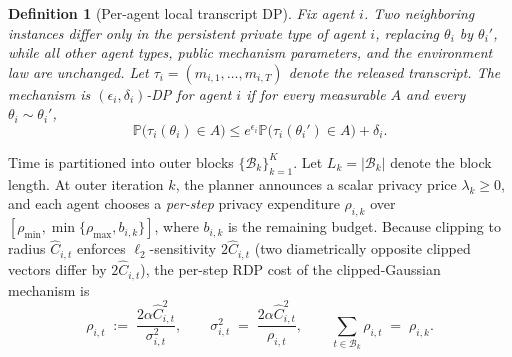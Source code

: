 \documentclass{article}
\newtheorem{definition}{Definition}
\newcommand{\Prob}{\mathbb{P}}
\begin{document}
\begin{definition}[Per-agent local transcript DP]
\label{def:PALT}
Fix agent $i$. Two neighboring instances differ only in the persistent private type of agent $i$, replacing $\theta_i$ by $\theta_i'$, while all other agent types, public mechanism parameters, and the environment law are unchanged. Let $\tau_i = (m_{i,1}, \ldots, m_{i,T})$ denote the released transcript. The mechanism is $(\epsilon_i, \delta_i)$-DP for agent $i$ if for every measurable $A$ and every $\theta_i \sim \theta_i'$,
\begin{equation}
\Prob\big(\tau_i(\theta_i)\in A\big)
\le
e^{\epsilon_i}\Prob\big(\tau_i(\theta_i')\in A\big)+\delta_i.
\end{equation}
\end{definition}



Time is partitioned into outer blocks $\{\mathcal{B}_k\}_{k=1}^{K}$. Let $L_k = |\mathcal{B}_k|$ denote the block length. At outer iteration $k$, the planner announces a scalar privacy price $\lambda_k\ge 0$, and each agent chooses a \emph{per-step} privacy expenditure $\rho_{i,k}$ over $[\rho_{\min}, \min\{\rho_{\max},b_{i,k}\}]$, where $b_{i,k}$ is the remaining budget. Because clipping to radius $\hat C_{i,t}$ enforces $\ell_2$-sensitivity $2\hat C_{i,t}$ (two diametrically opposite clipped vectors differ by $2\hat C_{i,t}$), the per-step RDP cost of the clipped-Gaussian mechanism is
\begin{equation}
    \rho_{i,t} \;:=\; \frac{2\alpha \hat{C}_{i,t}^2}{\sigma_{i,t}^2}, \qquad \sigma_{i,t}^2 \;=\; \frac{2\alpha \hat{C}_{i,t}^2}{\rho_{i,t}}, \qquad \sum_{t \in \mathcal{B}_k} \rho_{i,t} \;=\; \rho_{i,k}.
\end{equation}
\end{document}
